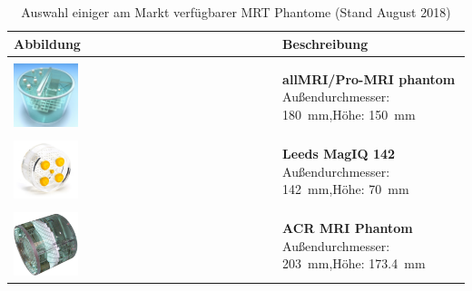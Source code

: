 \begin{table}[H]
	\caption[Kommerzielle MRT-Phantome]{Auswahl einiger am Markt verfügbarer MRT Phantome (Stand August 2018)}
	\centering
	\begin{tabularx}{\textwidth}{l X}
		\toprule
		\textbf{Abbildung} & \textbf{Beschreibung} \\
		\midrule \\[5pt]
		\includegraphics[width=0.25\textwidth,valign=t]{img/phantoms/allMRI.jpg} & \textbf{allMRI/\-Pro-MRI \newline180mm phantom} \newline Außendurchmesser: \SI{180}{\mm},\newline Höhe: \SI{150}{\mm} \newline \cite{allMRIphantom} \\
		&\\
		\includegraphics[width=0.25\textwidth,valign=t]{img/phantoms/MagIQ.jpg} & \textbf{Leeds MagIQ 142} \newline Außendurchmesser: \SI{142}{\mm},\newline Höhe: \SI{70}{\mm} \newline \cite{leeds} \\
		&\\
		\includegraphics[width=0.25\textwidth,valign=t]{img/phantoms/acr.jpg} & \textbf{ACR MRI Phantom} \newline Außendurchmesser: \SI{203}{\mm},\newline Höhe: \SI{173.4}{\mm} \newline \cite{acr} \\

\end{tabularx}
\end{table}
